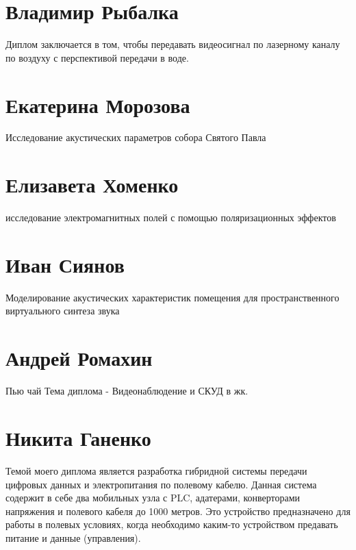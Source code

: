 \documentclass{article}
\begin{document}
\section*{Владимир Рыбалка}

Диплом заключается в том, чтобы передавать видеосигнал по лазерному каналу по воздуху с перспективой передачи в воде.

\section*{Екатерина Морозова}

Исследование акустических параметров собора Святого Павла

\section*{Елизавета Хоменко}

исследование электромагнитных полей с помощью поляризационных эффектов

\section*{Иван Сиянов}

Моделирование акустических характеристик помещения для пространственного виртуального синтеза звука

\section*{Андрей Ромахин}
Пью чай
Тема диплома - Видеонаблюдение и СКУД в жк.

\section*{Никита Ганенко}
Темой моего диплома является разработка гибридной системы передачи цифровых данных и электропитания по полевому кабелю. Данная система содержит в себе два мобильных узла с PLC, адатерами, конверторами напряжения и полевого кабеля до 1000 метров. Это устройство предназначено для работы в полевых условиях, когда необходимо каким-то устройством предавать питание и данные (управления).
\end{document}
